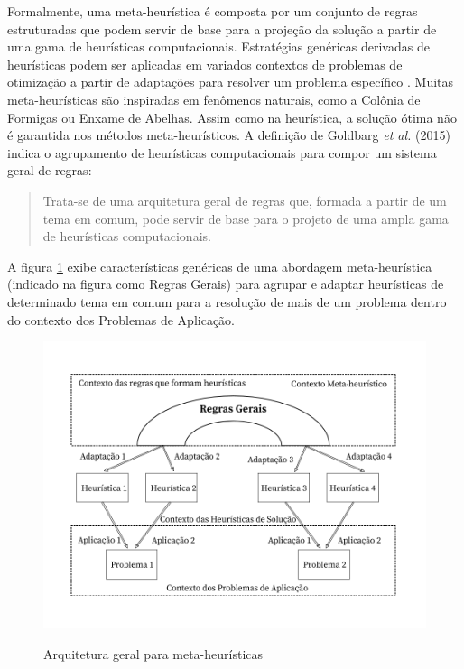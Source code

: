 Formalmente, uma meta-heurística é composta por um conjunto de regras estruturadas que podem servir de base para a projeção da solução a partir de uma gama de heurísticas computacionais. Estratégias genéricas derivadas de heurísticas  podem ser aplicadas em variados contextos de problemas de otimização a partir de adaptações para resolver um problema específico \cite{maxwell}. Muitas meta-heurísticas são inspiradas em fenômenos naturais, como a Colônia de Formigas ou Enxame de Abelhas. Assim como na heurística, a solução ótima não é garantida nos métodos meta-heurísticos. A definição de Goldbarg \emph{et al.} (2015) indica o agrupamento de heurísticas computacionais para compor um sistema geral de regras: 

\begin{quote}
Trata-se de uma arquitetura geral de regras que, formada a partir de um tema em comum, pode servir de base para o projeto de uma ampla gama de heurísticas computacionais.
\end{quote}

A figura \ref{heuristica-goldbarg} exibe características genéricas de uma abordagem meta-heurística (indicado na figura como Regras Gerais) para agrupar e adaptar heurísticas de determinado tema em comum para a resolução de mais de um problema dentro do contexto dos Problemas de Aplicação.

\begin{figure}[H]
  \centering
  \caption{Arquitetura geral para meta-heurísticas}
 \includegraphics[scale=0.4]{imagens/metaheuristica.png} \par
\bigskip
\label{heuristica-goldbarg}
    \cite[p. 75]{goldbarg}
\end{figure}

